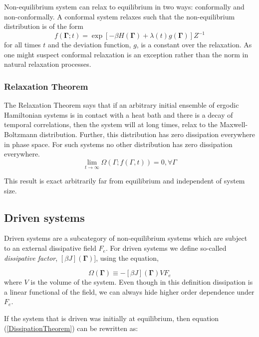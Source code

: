\documentclass[a4paper,12pt]{article}
\begin{document}
Non-equilibrium system can relax to equilibrium in two ways: conformally and non-conformally.
A conformal system relaxes such that the non-equilibrium distribution is of the form
\begin{equation}
  f(\bm{\Gamma};t)=\exp[-\beta H(\bm{\Gamma})+\lambda(t) g(\bm{\Gamma})] Z^{-1}
\end{equation}
for all times $t$ and the deviation function, $g$, is a constant over the relaxation.
As one might suspect conformal relaxation is an exception rather than the norm in natural relaxation processes.

\subsubsection{Relaxation Theorem}
The Relaxation Theorem says that if an arbitrary initial ensemble of ergodic Hamiltonian systems is in contact with a heat bath and there is a decay of temporal correlations, then the system will at long times, relax to the Maxwell-Boltzmann distribution. Further, this distribution has zero dissipation everywhere in phase space. For such systems no other distribution has zero dissipation everywhere.
\begin{displaymath}
  \lim_{t\to \infty } \Omega (\Gamma ;f(\Gamma ,t))=0, \forall \Gamma
\end{displaymath}

This result is exact arbitrarily far from equilibrium and independent of system size.
\subsection{Driven systems}

Driven systems are a subcategory of non-equilibrium systems which are subject to an external dissipative field $F_e$.
For driven systems we define so-called \textit{dissipative factor}, $[\beta J](\bm{\Gamma})]$, using the equation,

\begin{equation}
\label{primaryDissipationFunction}
  \Omega(\bm{\Gamma})\equiv -[\beta J](\bm{\Gamma})V F_e
\end{equation}
where $V$ is the volume of the system.
Even though in this definition dissipation is a linear functional of the field, we can always hide higher order dependence under $F_e$.

If the system that is driven was initially at equilibrium, then equation (\ref{DissipationTheorem}) can be rewritten as:
\end{document}
